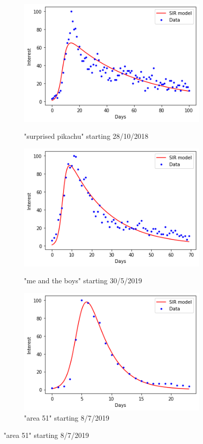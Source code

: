 \documentclass[12pt, letterpaper]{article}
\begin{document}
\begin{figure}[htbp!]
\begin{subfigure}{.5\textwidth}
    \centering
    \caption{"surprised pikachu" starting 28/10/2018}
    \includegraphics[width=0.8\linewidth]{pikachu}
    \label{fig:sfig1}
\end{subfigure}
\begin{subfigure}{.5\textwidth}
    \centering
    \caption{"me and the boys" starting 30/5/2019}
    \includegraphics[width=0.8\linewidth]{boys}
    \label{fig:sfig2}
\end{subfigure}
\begin{subfigure}{.5\textwidth}
    \centering
    \caption{"area 51" starting 8/7/2019}
    \includegraphics[width=0.8\linewidth]{area51}

\end{subfigure}
\end{figure}
\end{document}
